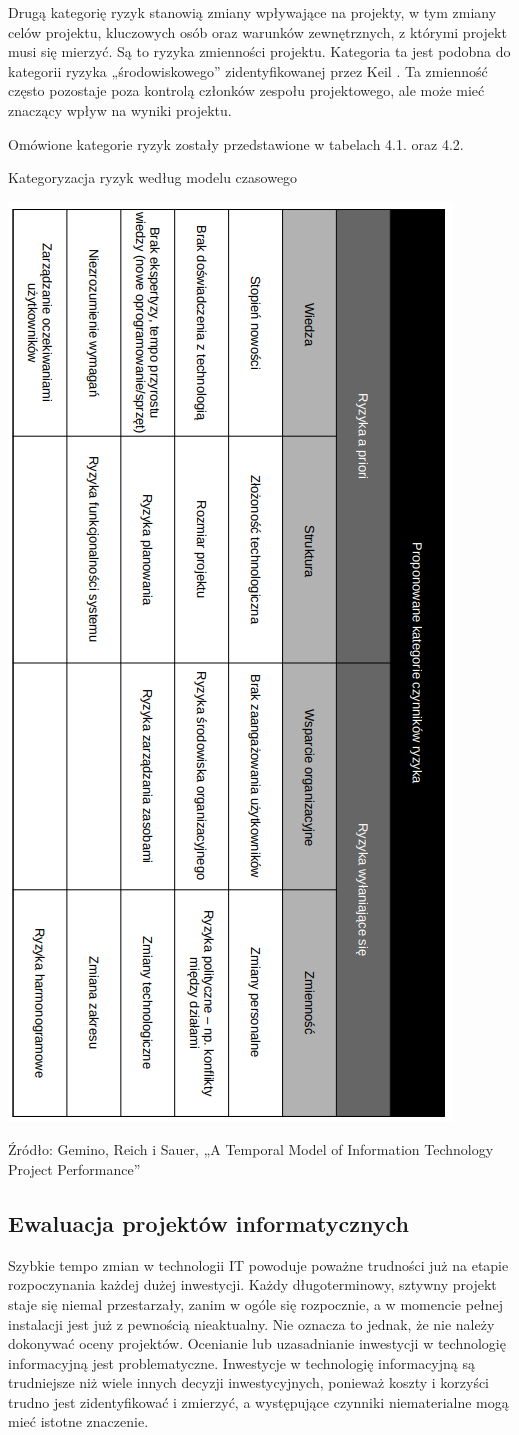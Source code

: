 Drugą kategorię ryzyk stanowią zmiany wpływające na projekty, w tym zmiany celów projektu, kluczowych osób oraz warunków zewnętrznych, z którymi projekt musi się mierzyć. Są to ryzyka zmienności projektu.\autocite{gemino} Kategoria ta jest podobna do kategorii ryzyka „środowiskowego” zidentyfikowanej przez Keil \autocite{keil}. Ta zmienność często pozostaje poza kontrolą członków zespołu projektowego, ale może mieć znaczący wpływ na wyniki projektu.\autocite{ryzyka}

Omówione kategorie ryzyk zostały przedstawione w tabelach 4.1. oraz 4.2.

\begin{table}
    \caption{Kategoryzacja ryzyk według modelu czasowego}
    \centering
    \includegraphics[width=0.5\linewidth]{img/ryzyka3.png}
    \caption*{Źródło: Gemino, Reich i Sauer, „A Temporal Model of Information Technology Project Performance” }
  \end{table}


\subsection{Ewaluacja projektów informatycznych}
Szybkie tempo zmian w technologii IT powoduje poważne trudności już na etapie rozpoczynania każdej dużej inwestycji. Każdy długoterminowy, sztywny projekt staje się niemal przestarzały, zanim w ogóle się rozpocznie, a w momencie pełnej instalacji jest już z pewnością nieaktualny. Nie oznacza to jednak, że nie należy dokonywać oceny projektów. Ocenianie lub uzasadnianie inwestycji w technologię informacyjną jest problematyczne. Inwestycje w technologię informacyjną są trudniejsze niż wiele innych decyzji inwestycyjnych, ponieważ koszty i korzyści trudno jest zidentyfikować i zmierzyć, a występujące czynniki niematerialne mogą mieć istotne znaczenie. \autocite{powell1992information}

